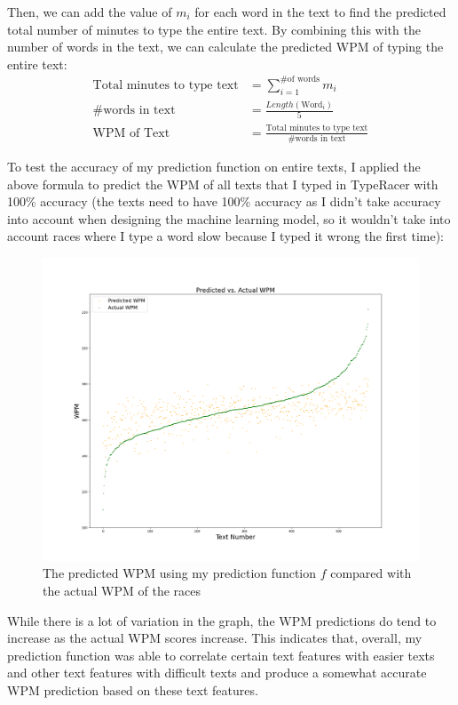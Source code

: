 \documentclass[12pt]{article}
\begin{document}
Then, we can add the value of $m_i$ for each word in the text to find the predicted total number of minutes to type the entire text. By combining this with the number of words in the text, we can calculate the predicted WPM of typing the entire text:
\begin{align*}
	\text{Total minutes to type text} & = \sum_{i=1}^{\text{\# of words}} m_i
	\\
	\text{\# words in text}           & = \frac{Length(\text{Word}_i)}{5}
	\\
	\text{WPM of Text}                & = \frac{\text{Total minutes to type text}}{\text{\# words in text}}
\end{align*}

To test the accuracy of my prediction function on entire texts, I applied the above formula to predict the WPM of all texts that I typed in TypeRacer with 100\% accuracy (the texts need to have 100\% accuracy as I didn't take accuracy into account when designing the machine learning model, so it wouldn't take into account races where I type a word slow because I typed it wrong the first time):

\begin{figure}[H]
	\caption{The predicted WPM using my prediction function $f$ compared with the actual WPM of the races}
	\includegraphics[width=\textwidth]{predicted-vs-actual-wpm.png}
\end{figure}

While there is a lot of variation in the graph, the WPM predictions do tend to increase as the actual WPM scores increase. This indicates that, overall, my prediction function was able to correlate certain text features with easier texts and other text features with difficult texts and produce a somewhat accurate WPM prediction based on these text features.
\end{document}
